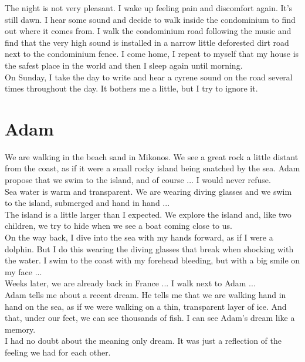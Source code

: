 \documentclass[11pt]{book}
\begin{document}
The night is not very pleasant. I wake up feeling pain and discomfort again. It's still dawn. I hear some sound and decide to walk inside the condominium to find out where it comes from. I walk the condominium road following the music and find that the very high sound is installed in a narrow little deforested dirt road next to the condominium fence. I come home, I repeat to myself that my house is the safest place in the world and then I sleep again until morning. \\

On Sunday, I take the day to write and hear a cyrene sound on the road several times throughout the day. It bothers me a little, but I try to ignore it.

\chapter{Adam}

We are walking in the beach sand in Mikonos. We see a great rock a little distant from the coast, as if it were a small rocky island being snatched by the sea. Adam propose that we swim to the island, and of course ... I would never refuse. \\

Sea water is warm and transparent. We are wearing diving glasses and we swim to the island, submerged and hand in hand ... \\

The island is a little larger than I expected. We explore the island and, like two children, we try to hide when we see a boat coming close to us. \\

On the way back, I dive into the sea with my hands forward, as if I were a dolphin. But I do this wearing the diving glasses that break when shocking with the water. I swim to the coast with my forehead bleeding, but with a big smile on my face ... \\

Weeks later, we are already back in France ... I walk next to Adam ... \\

Adam tells me about a recent dream. He tells me that we are walking hand in hand on the sea, as if we were walking on a thin, transparent layer of ice. And that, under our feet, we can see thousands of fish. I can see Adam's dream like a memory. \\

I had no doubt about the meaning only dream. It was just a reflection of the feeling we had for each other.
\end{document}
